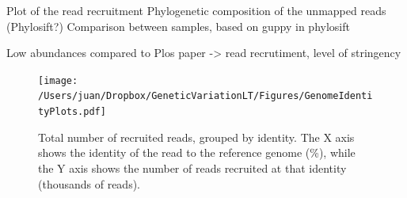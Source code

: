 Plot of the read recruitment
Phylogenetic composition of the unmapped reads (Phylosift?)
Comparison between samples, based on guppy in phylosift

Low abundances compared to Plos paper -> read recrutiment, level of stringency



\begin{figure}[!hbtp]
  \centering
  \texttt{[image: /Users/juan/Dropbox/GeneticVariationLT/Figures/GenomeIdentityPlots.pdf]}
  \caption{Total number of recruited reads, grouped by identity. The X axis shows the identity of the read to the reference genome (\%), while the Y axis shows the number of reads recruited at that identity (thousands of reads).}
  \label{GenomeReadIdentity}
\end{figure}


